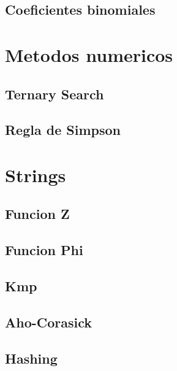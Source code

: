 \subsection{Coeficientes binomiales}
\raggedbottom
\hrulefill

\section{Metodos numericos}
\subsection{Ternary Search}
\raggedbottom
\hrulefill
\subsection{Regla de Simpson}
\raggedbottom
\hrulefill

\section{Strings}
\subsection{Funcion Z}
\raggedbottom
\hrulefill
\subsection{Funcion Phi}
\raggedbottom
\hrulefill
\subsection{Kmp}
\raggedbottom
\hrulefill
\subsection{Aho-Corasick}
\raggedbottom
\hrulefill
\subsection{Hashing}
\raggedbottom
\hrulefill
